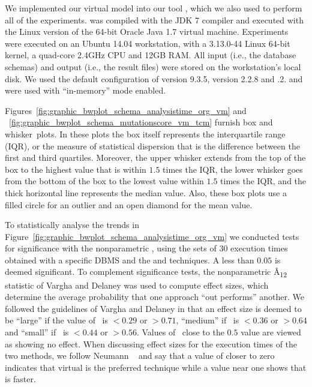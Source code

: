 
We implemented our virtual model into our \SA tool \cite{Kapfhammer2013,McMinn2015,Wright2014}, which we also used to
perform all of the experiments. \SA was compiled with the JDK 7 compiler and executed with the Linux version of the 64-bit Oracle Java 1.7 virtual machine.  Experiments were executed on an Ubuntu 14.04 workstation, with a 3.13.0-44 Linux 64-bit kernel, a quad-core 2.4GHz CPU and 12GB RAM. All input (i.e., the database schemas) and output (i.e., the result files) were stored on the workstation's local disk. We used the default configuration of \PostgreSQL version 9.3.5, \HyperSQL version 2.2.8 and .2.  \HyperSQL and \SQLite were used with ``in-memory'' mode enabled.


 Figures~\ref{fig:graphic_bwplot_schema_analysistime_org_vm} and ~\ref{fig:graphic_bwplot_schema_mutationscore_vm_tcm} furnish box and \mbox{whisker plots}.  In these plots the box itself represents the interquartile range (IQR), or the measure of statistical dispersion that is the difference between the first and third quartiles. Moreover, the upper whisker extends from the top of the box to the highest value that is within $1.5$ times the IQR, the lower whisker goes from the bottom of the box to the lowest value within $1.5$ times the IQR, and the thick horizontal line represents the median value. Also, these box plots use a filled circle for an outlier and an open diamond for the mean value.


\begin{sloppypar}
To statistically analyse the trends in Figure~\ref{fig:graphic_bwplot_schema_analysistime_org_vm} we conducted tests for significance with the nonparametric \wilcoxon, using the sets of 30 execution times obtained with a specific DBMS and the \Original and \vma techniques.  A \mbox{\pvalue} less than $0.05$ is deemed significant.  To complement significance tests, the nonparametric \^{A}\textsubscript{12} statistic of Vargha and Delaney \cite{Vargha2000} was used to compute effect sizes, which determine the average probability that one approach ``out performs'' another.  We followed the guidelines of Vargha and Delaney in that an effect size is deemed to be ``large'' if the value of \atwelve~is $< 0.29$ or $> 0.71$, ``medium'' if \atwelve~is $< 0.36$ or $> 0.64$ and ``small'' if \atwelve~is $< 0.44$ or $> 0.56$.  Values of \atwelve~close to the $0.5$ value are viewed as showing no effect.  When discussing effect sizes for the execution times of the two methods, we follow Neumann \etal~\cite{Neumann2015} and say that a value of \atwelve closer to zero indicates that virtual is the preferred technique while a value near one shows that \Original is faster.
\end{sloppypar}

